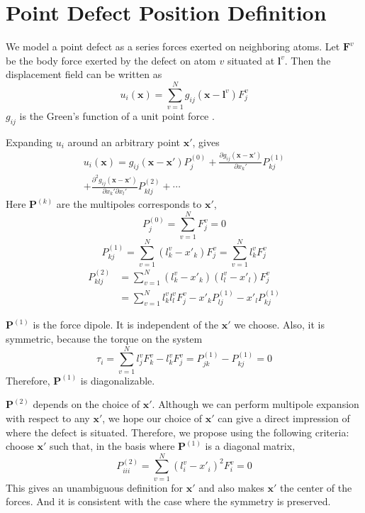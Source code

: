 \documentclass[%
 reprint,
 nofootinbib,
 amsmath,amssymb,
 aps,
]{revtex4-1}
\begin{document}
\appendix
\section{Point Defect Position Definition}
\label{app:position}
We model a point defect as a series forces exerted on neighboring atoms.
Let $\bm{F}^{v}$ be the body force exerted by the defect on atom $v$ situated at $\bm{l}^v$.
Then the displacement field can be written as
\begin{equation}
u_i(\bm{x}) = \sum_{v=1}^{N} g_{ij}(\bm{x}-\bm{l}^v) F_j^v
\end{equation}
$g_{ij}$ is the Green's function of a unit point force \cite{seifmultipolar,ting1997three}.

Expanding $u_i$ around an arbitrary point $\bm{x'}$, gives
\begin{multline}
u_i(\bm{x})
= g_{ij}(\bm{x}-\bm{x'}) P_j^{(0)}
 + \frac{\partial g_{ij}(\bm{x}-\bm{x'})}{\partial x_k'} P_{kj}^{(1)}\\
 + \frac{\partial^2 g_{ij}(\bm{x}-\bm{x'})}{\partial x_k' \partial x_l'} P_{klj}^{(2)}
 + \cdots
\end{multline}
Here $\bm{P}^{(k)}$ are the multipoles corresponds to $\bm{x'}$,
\begin{equation}
  P_j^{(0)} = \sum_{v=1}^N F_j^v = 0
\end{equation}
\begin{equation}
  P_{kj}^{(1)} = \sum_{v=1}^N (l_k^v-x'_k) F_j^v = \sum_{v=1}^N l_k^v F_j^v
\end{equation}
\begin{align}
  P_{klj}^{(2)} & = \sum_{v=1}^N (l_k^v-x'_k) (l_l^v-x'_l) F_j^v \nonumber \\
  & = \sum_{v=1}^N l_k^vl_l^v F_j^v - x'_k P_{lj}^{(1)} - x'_l P_{kj}^{(1)}
\end{align}

$\bm{P}^{(1)}$ is the force dipole.
It is independent of the $\bm{x'}$ we choose.
Also, it is symmetric, because the torque on the system
\begin{equation}
  \tau_i = \sum_{v=1}^N l_j^v F_k^v - l_k^v F_j^v = P_{jk}^{(1)} - P_{kj}^{(1)} = 0
\end{equation}
Therefore, $\bm{P}^{(1)}$ is diagonalizable.

$\bm{P}^{(2)}$ depends on the choice of $\bm{x'}$.
Although we can perform multipole expansion with respect to any $\bm{x'}$, we hope our choice of $\bm{x'}$ can give a direct impression of where the defect is situated.
Therefore, we propose using the following criteria:
choose $\bm{x'}$ such that, in the basis where $\bm{P}^{(1)}$ is a diagonal matrix,
\begin{equation}
  P_{iii}^{(2)} = \sum_{v=1}^N (l_i^v-x'_i)^2 F_i^v = 0
\end{equation}
This gives an unambiguous definition for $\bm{x'}$ and also makes $\bm{x'}$ the center of the forces.
And it is consistent with the case where the symmetry is preserved.
\end{document}
